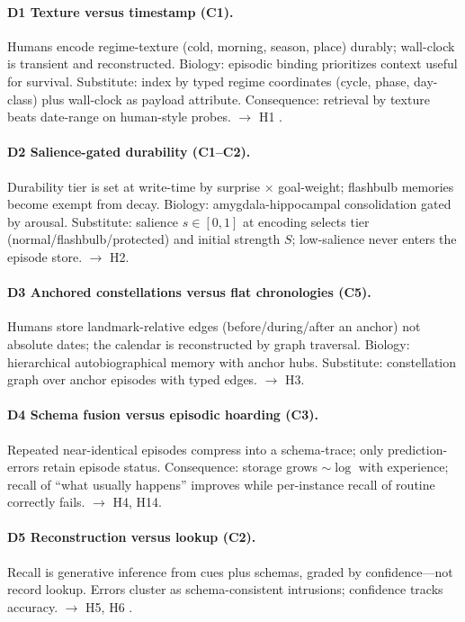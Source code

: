 \documentclass[letterpaper]{article}
\begin{document}
\paragraph{D1 Texture versus timestamp (C1).} Humans encode regime-texture (cold, morning, season, place) durably; wall-clock is transient and reconstructed. Biology: episodic binding prioritizes context useful for survival. Substitute: index by typed regime coordinates (cycle, phase, day-class) plus wall-clock as payload attribute. Consequence: retrieval by texture beats date-range on human-style probes. $\to$ H1 \citep{cheng2026blind}.

\paragraph{D2 Salience-gated durability (C1--C2).} Durability tier is set at write-time by surprise $\times$ goal-weight; flashbulb memories become exempt from decay. Biology: amygdala-hippocampal consolidation gated by arousal. Substitute: salience $s\in[0,1]$ at encoding selects tier (normal/flashbulb/protected) and initial strength $S$; low-salience never enters the episode store. $\to$ H2.

\paragraph{D3 Anchored constellations versus flat chronologies (C5).} Humans store landmark-relative edges (before/during/after an anchor) not absolute dates; the calendar is reconstructed by graph traversal. Biology: hierarchical autobiographical memory with anchor hubs. Substitute: constellation graph over anchor episodes with typed edges. $\to$ H3.

\paragraph{D4 Schema fusion versus episodic hoarding (C3).} Repeated near-identical episodes compress into a schema-trace; only prediction-errors retain episode status. Consequence: storage grows $\sim\log$ with experience; recall of ``what usually happens'' improves while per-instance recall of routine correctly fails. $\to$ H4, H14.

\paragraph{D5 Reconstruction versus lookup (C2).} Recall is generative inference from cues plus schemas, graded by confidence---not record lookup. Errors cluster as schema-consistent intrusions; confidence tracks accuracy. $\to$ H5, H6 \citep{bartlett1932remembering}.
\end{document}
